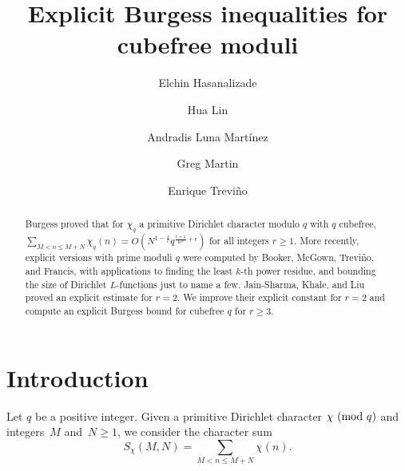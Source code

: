 \documentclass[12pt]{amsart}
\title{Explicit Burgess inequalities for cubefree moduli}
\theoremstyle{plain}
\theoremstyle{definition}
\renewcommand{\pmod}[1]{{\ifmmode\text{\rm\ (mod~$#1$)}\else\discretionary{}{}{\hbox{ }}\rm(mod~$#1$)\fi}}
\begin{document}
\author[E. Hasanalizade]{Elchin Hasanalizade}
\address[Elchin Hasanalizade]{School of Information Technologies and Engineering\\ADA University, Baku, Azerbaijan}

\author[H. Lin]{Hua Lin}
\address[Hua Lin]{Department of Mathematics\\
Northwestern University, Evanston, IL, USA}

\author[A. Luna Mart\'inez]{Andradis Luna Mart\'inez}
\address[Andradis Luna Mart\'inez]{Escuela de Matem\'aticas\\Universidad Aut\'onoma de Santo Domingo, Santo Domingo, Dominican Republic}

\author[G. Martin]{Greg Martin}
\address[Greg Martin]{Department of Mathematics\\
University of British Columbia\\
Room 121, 1984 Mathematics Road\\
Vancouver, BC, Canada  V6T 1Z2}

\author[E. Trevi{\~n}o]{Enrique Trevi{\~n}o}
\address[Enrique Trevi\~no]{Department of Mathematics and Computer Science\\Lake Forest College, Lake Forest, IL, USA}




\begin{abstract}
    Burgess proved that for $\chi_q$ a primitive Dirichlet character modulo $q$ with $q$ cubefree, $\sum_{M< n\le M+N}\chi_q(n)= O\left(N^{1-\frac{1}{r}}q^{\frac{r+1}{4r^2}+\epsilon}\right)  $ for all integers $r\ge1.$ More recently, explicit versions with prime moduli $q$ were computed by Booker, McGown, Trevi\~{n}o, and Francis, with applications to finding the least $k$-th power residue, and bounding the size of Dirichlet $L$-functions just to name a few. Jain-Sharma, Khale, and Liu proved an explicit estimate for $r=2.$ We improve their explicit constant for $r = 2$ and compute an explicit Burgess bound for cubefree $q$ for $r\ge 3$.
\end{abstract}


\maketitle




\section{Introduction}
Let $q$ be a positive integer.
Given a primitive Dirichlet character $\chi\pmod q$ and integers~$M$ and~$N\ge1$, we consider the character sum
\begin{equation*}
    S_\chi\left(M, N\right)=\sum_{M<n \le M+N}\chi(n).
\end{equation*}
\end{document}
